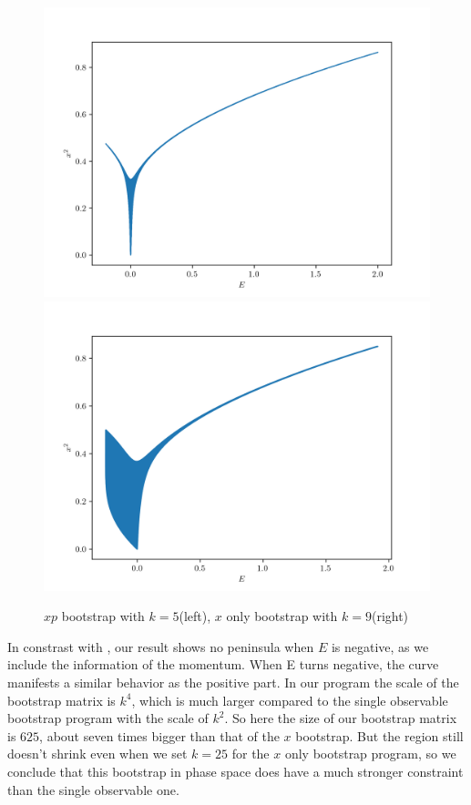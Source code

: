 \documentclass[aps, preprint,amsmath, amssymb]{revtex4-2}
\begin{document}
\begin{figure}
    \includegraphics[width=0.45\linewidth]{plot_5.png}
    \includegraphics[width=0.45\linewidth]{x_9.png}
    \caption{$xp$ bootstrap with $k = 5$(left), $x$ only bootstrap with $k = 9$(right)}
    \label{fig:doublewell}
\end{figure}

%

In constrast with \cite{Nakayama_2022}, our result shows no peninsula when $E$ is negative, as we include the information of the momentum. When E turns negative, the curve manifests a similar behavior as the positive part. In our program the scale of the bootstrap matrix is $k^4$, which is much larger compared to the single observable bootstrap program with the scale of $k^2$. So here the size of our bootstrap matrix is $625$, about seven times bigger than that of the $x$ bootstrap. But the region still doesn't shrink even when we set $k = 25$ for the $x$ only bootstrap program, so we conclude that this bootstrap in phase space does have a much stronger constraint than the single observable one.

\end{document}
